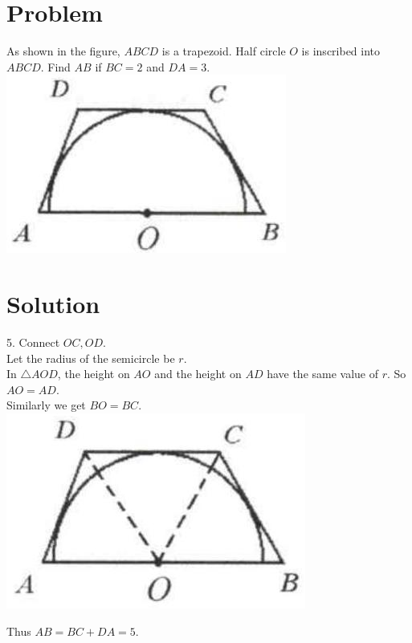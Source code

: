 \documentclass{article}
\begin{document}
\section*{Problem}
As shown in the figure, \(A B C D\) is a trapezoid. Half circle \(O\) is inscribed into \(A B C D\). Find \(A B\) if \(B C=2\) and \(D A=3\).\\
\centering
\includegraphics[width=\textwidth]{images/156(1).jpg}

\section*{Solution}
5.
Connect \(O C, O D\).\\
Let the radius of the semicircle be \(r\).\\
In \(\triangle A O D\), the height on \(A O\) and the height on \(A D\) have the same value of \(r\). So \(A O=A D\).\\
Similarly we get \(B O=B C\).\\
\centering
\includegraphics[width=\textwidth]{images/160(1).jpg}

Thus \(A B=B C+D A=5\).
\end{document}
